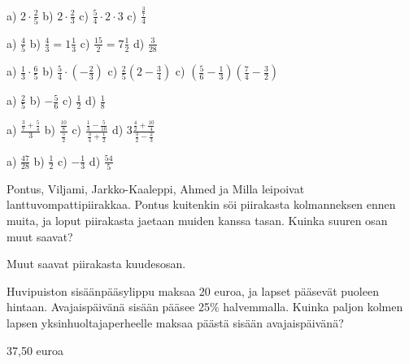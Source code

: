\begin{tehtava}
    a) $2 \cdot \frac{2}{5}$
    b) $2 \cdot \frac{2}{3}$
    c) $\frac{5}{4} \cdot 2 \cdot 3$
    c) $\frac{\frac{3}{7}}{4}$
    
    \begin{vastaus}
		a) $\frac{4}{5}$
		b) $\frac{4}{3} = 1 \frac{1}{3}$
		c) $\frac{15}{2} = 7 \frac{1}{2}$
		d) $\frac{3}{28}$
    \end{vastaus}
\end{tehtava}

\begin{tehtava}
    a) $\frac{1}{3} \cdot \frac{6}{5}$
    b) $\frac{5}{4} \cdot (-\frac{2}{3})$
    c) $\frac{2}{5} (2 - \frac{3}{4})$
    c) $(\frac{5}{6} - \frac{1}{3})(\frac{7}{4} - \frac{3}{2})$
    
    \begin{vastaus}
        a) $\frac{2}{5}$
        b) $-\frac{5}{6}$
        c) $\frac{1}{2}$
        d) $\frac{1}{8}$
    \end{vastaus}
\end{tehtava}

\begin{tehtava} %
    a) $ \frac{\frac{3}{7} + \frac{5}{4}}{3}$
    b) $ \frac{\frac{10}{8}}{\frac{5}{2}}$
    c) $ \frac{\frac{1}{3} - \frac{5}{10}}{\frac{3}{4} + \frac{1}{2}}$
    d) $ 3\frac{\frac{4}{2} + \frac{10}{4}}{\frac{3}{2} - \frac{2}{3}}$
    
    \begin{vastaus}
        a) $\frac{47}{28}$
        b) $\frac{1}{2}$
        c) $-\frac{1}{3}$
        d) $\frac{54}{5}$
    \end{vastaus}
\end{tehtava}

\begin{tehtava} %
    Pontus, Viljami, Jarkko-Kaaleppi, Ahmed ja Milla leipoivat lanttuvompattipiirakkaa.
    Pontus kuitenkin söi piirakasta kolmanneksen ennen muita, ja loput piirakasta
    jaetaan muiden kanssa tasan. Kuinka suuren osan muut saavat?
    
    \begin{vastaus}
        Muut saavat piirakasta kuudesosan.
    \end{vastaus}
\end{tehtava}

\begin{tehtava} %
    Huvipuiston sisäänpääsylippu maksaa 20 euroa, ja lapset pääsevät puoleen
    hintaan. Avajaispäivänä sisään pääsee 25\% halvemmalla. Kuinka paljon kolmen
    lapsen yksinhuoltajaperheelle maksaa päästä sisään avajaispäivänä?
    
    \begin{vastaus}
        37,50 euroa
    \end{vastaus}
\end{tehtava}
